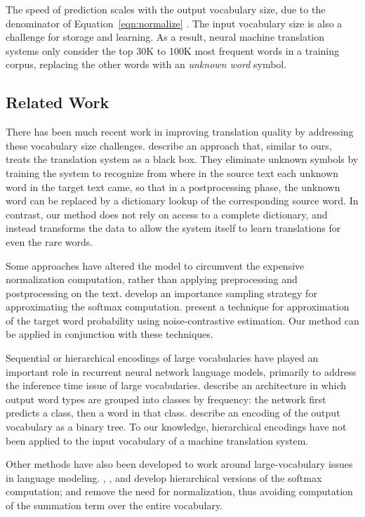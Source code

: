 The speed of prediction scales with the output vocabulary size, due to the
denominator of Equation~\ref{eqn:normalize} \cite{journals/corr/JeanCMB14}. The
input vocabulary size is also a challenge for storage and learning. As a
result, neural machine translation systems only consider the top 30K to 100K
most frequent words in a training corpus, replacing the other words with an
\emph{unknown word} symbol.

\subsection{Related Work}

There has been much recent work in improving translation quality by addressing
these vocabulary size challenges.  describe
an approach that, similar to ours, treats the translation system as a black
box. They eliminate unknown symbols by training the system to recognize from
where in the source text each unknown word in the target text came, so that in
a postprocessing phase, the unknown word can be replaced by a dictionary lookup
of the corresponding source word. In contrast, our method does not rely on
access to a complete dictionary, and instead transforms the data to allow the
system itself to learn translations for even the rare words.

Some approaches have altered the model to circumvent the expensive
normalization computation, rather than applying preprocessing and
postprocessing on the text.  develop an
importance sampling strategy for approximating the softmax computation.
 present a technique for approximation of the target
word probability using noise-contrastive estimation. Our method can be applied
in conjunction with these techniques.

Sequential or hierarchical encodings of large vocabularies have played an
important role in recurrent neural network language models, primarily to
address the inference time issue of large vocabularies. 
describe an architecture in which output word types are grouped into classes by
frequency: the network first predicts a class, then a word in that
class.  describe an encoding of the output
vocabulary as a binary tree. To our knowledge, hierarchical encodings have not
been applied to the input vocabulary of a machine translation system.

Other methods have also been developed to work around large-vocabulary issues
in language modeling. ,
, and  develop hierarchical versions
of the softmax computation;  and
 remove the need for normalization,
thus avoiding computation of the summation term over the entire vocabulary.

